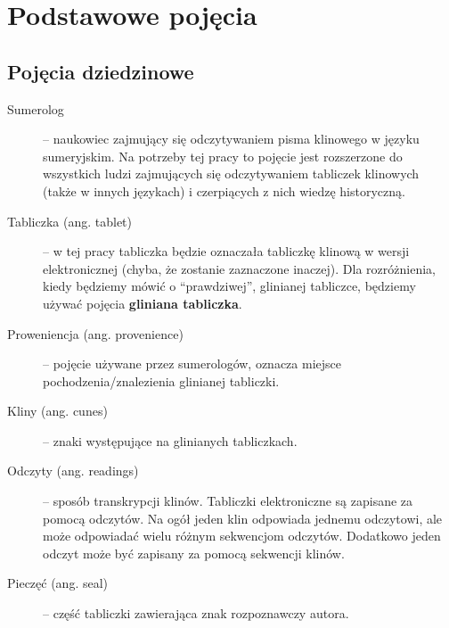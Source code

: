 \section{Podstawowe pojęcia}\label{r:pojecia}
\subsection{Pojęcia dziedzinowe}
\begin{description}
 \item[Sumerolog] -- naukowiec zajmujący się odczytywaniem pisma klinowego w języku sumeryjskim. Na potrzeby tej pracy
		      to pojęcie jest rozszerzone do wszystkich ludzi zajmujących się odczytywaniem tabliczek klinowych 
		      (także w innych językach) i czerpiących z nich wiedzę historyczną.
 \item[Tabliczka (ang. tablet)] -- w tej pracy tabliczka będzie oznaczała tabliczkę klinową w wersji elektronicznej 
		  (chyba, że zostanie zaznaczone inaczej). Dla rozróżnienia, kiedy będziemy mówić o ``prawdziwej'', 
		  glinianej tabliczce, będziemy używać pojęcia \textbf{gliniana tabliczka}.
 \item[Proweniencja (ang. provenience)] -- pojęcie używane przez sumerologów, oznacza miejsce pochodzenia/znalezienia 
		    glinianej tabliczki.
 \item[Kliny (ang. cunes)] -- znaki występujące na glinianych tabliczkach.
 \item[Odczyty (ang. readings)] -- sposób transkrypcji klinów. Tabliczki elektroniczne są zapisane za pomocą odczytów. 
Na ogół jeden klin odpowiada jednemu odczytowi, ale może odpowiadać wielu różnym sekwencjom odczytów. 
Dodatkowo jeden odczyt może być zapisany za pomocą sekwencji klinów.
 \item[Pieczęć (ang. seal)] -- część tabliczki zawierająca znak rozpoznawczy autora.
\end{description}


